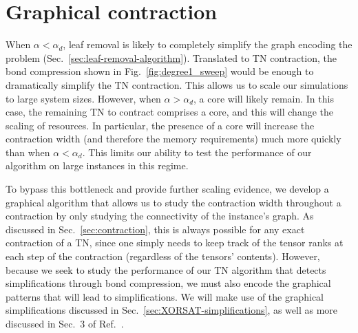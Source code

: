 \section{Graphical contraction} \label{sec:graphical-method}
When $\alpha < \alpha_d$, leaf removal is likely to completely simplify the graph encoding the problem (Sec.~\ref{sec:leaf-removal-algorithm}).
Translated to TN contraction, the bond compression shown in Fig.~\ref{fig:degree1_sweep} would be enough to dramatically simplify the TN contraction.
This allows us to scale our simulations to large system sizes.
However, when $\alpha > \alpha_d$, a core will likely remain.
In this case, the remaining TN to contract comprises a core, and this will change the scaling of resources.
In particular, the presence of a core will increase the contraction width (and therefore the memory requirements) much more quickly than when $\alpha < \alpha_d$.
This limits our ability to test the performance of our algorithm on large instances in this regime.

To bypass this bottleneck and provide further scaling evidence, we develop a graphical algorithm that allows us to study the contraction width throughout a contraction by only studying the connectivity of the instance's graph.
As discussed in Sec.~\ref{sec:contraction}, this is always possible for any exact contraction of a TN, since one simply needs to keep track of the tensor ranks at each step of the contraction (regardless of the tensors' contents).
However, because we seek to study the performance of our TN algorithm that detects simplifications through bond compression, we must also encode the graphical patterns that will lead to simplifications.
We will make use of the graphical simplifications discussed in Sec.~\ref{sec:XORSAT-simplifications}, as well as more discussed in Sec.~3 of Ref.~\cite{denny_algebraically_2012}.

